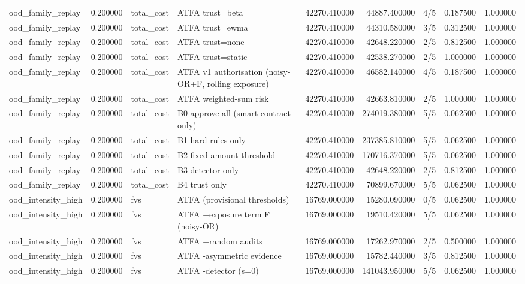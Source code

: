 \begin{tabular}{lrllrrlrr}
ood\_family\_replay & 0.200000 & total\_cost & ATFA trust=beta & 42270.410000 & 44887.400000 & 4/5 & 0.187500 & 1.000000 \\
ood\_family\_replay & 0.200000 & total\_cost & ATFA trust=ewma & 42270.410000 & 44310.580000 & 3/5 & 0.312500 & 1.000000 \\
ood\_family\_replay & 0.200000 & total\_cost & ATFA trust=none & 42270.410000 & 42648.220000 & 2/5 & 0.812500 & 1.000000 \\
ood\_family\_replay & 0.200000 & total\_cost & ATFA trust=static & 42270.410000 & 42538.270000 & 2/5 & 1.000000 & 1.000000 \\
ood\_family\_replay & 0.200000 & total\_cost & ATFA v1 authorisation (noisy-OR+F, rolling exposure) & 42270.410000 & 46582.140000 & 4/5 & 0.187500 & 1.000000 \\
ood\_family\_replay & 0.200000 & total\_cost & ATFA weighted-sum risk & 42270.410000 & 42663.810000 & 2/5 & 1.000000 & 1.000000 \\
ood\_family\_replay & 0.200000 & total\_cost & B0 approve all (smart contract only) & 42270.410000 & 274019.380000 & 5/5 & 0.062500 & 1.000000 \\
ood\_family\_replay & 0.200000 & total\_cost & B1 hard rules only & 42270.410000 & 237385.810000 & 5/5 & 0.062500 & 1.000000 \\
ood\_family\_replay & 0.200000 & total\_cost & B2 fixed amount threshold & 42270.410000 & 170716.370000 & 5/5 & 0.062500 & 1.000000 \\
ood\_family\_replay & 0.200000 & total\_cost & B3 detector only & 42270.410000 & 42648.220000 & 2/5 & 0.812500 & 1.000000 \\
ood\_family\_replay & 0.200000 & total\_cost & B4 trust only & 42270.410000 & 70899.670000 & 5/5 & 0.062500 & 1.000000 \\
ood\_intensity\_high & 0.200000 & fvs & ATFA (provisional thresholds) & 16769.000000 & 15280.090000 & 0/5 & 0.062500 & 1.000000 \\
ood\_intensity\_high & 0.200000 & fvs & ATFA +exposure term F (noisy-OR) & 16769.000000 & 19510.420000 & 5/5 & 0.062500 & 1.000000 \\
ood\_intensity\_high & 0.200000 & fvs & ATFA +random audits & 16769.000000 & 17262.970000 & 2/5 & 0.500000 & 1.000000 \\
ood\_intensity\_high & 0.200000 & fvs & ATFA -asymmetric evidence & 16769.000000 & 15782.440000 & 3/5 & 0.812500 & 1.000000 \\
ood\_intensity\_high & 0.200000 & fvs & ATFA -detector (s=0) & 16769.000000 & 141043.950000 & 5/5 & 0.062500 & 1.000000 \\

\end{tabular}

